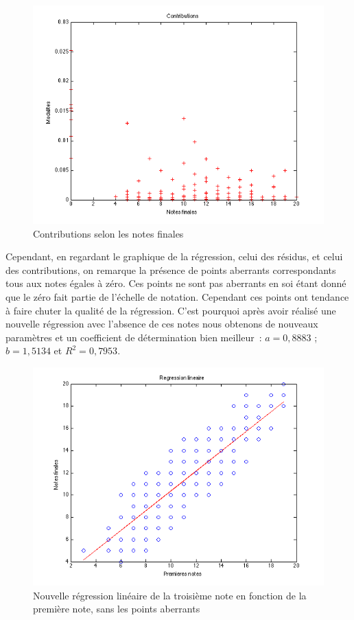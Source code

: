 \documentclass[11pt]{article}
\begin{document}
\begin{figure}[h]
\centering
\includegraphics[scale=0.5]{Images/fig8.png}
\caption{Contributions selon les notes finales}
\end{figure}

Cependant, en regardant le graphique de la régression, celui des résidus, et celui des contributions, on remarque la présence de points aberrants correspondants tous aux notes égales à zéro. Ces points ne sont pas aberrants en soi étant donné que le zéro fait partie de l'échelle de notation. Cependant ces points ont tendance à faire chuter la qualité de la régression. C'est pourquoi après avoir réalisé une nouvelle régression avec l'absence de ces notes nous obtenons de nouveaux paramètres et un coefficient de détermination bien meilleur : $a=0,8883$ ;  $b=1,5134$ et $R^2=0,7953$.

\begin{figure}[h]
\centering
\includegraphics[scale=0.55]{Images/fig9.png}
\caption{Nouvelle régression linéaire de la troisième note en fonction de la première note, sans les points aberrants}
\end{figure}
\end{document}
